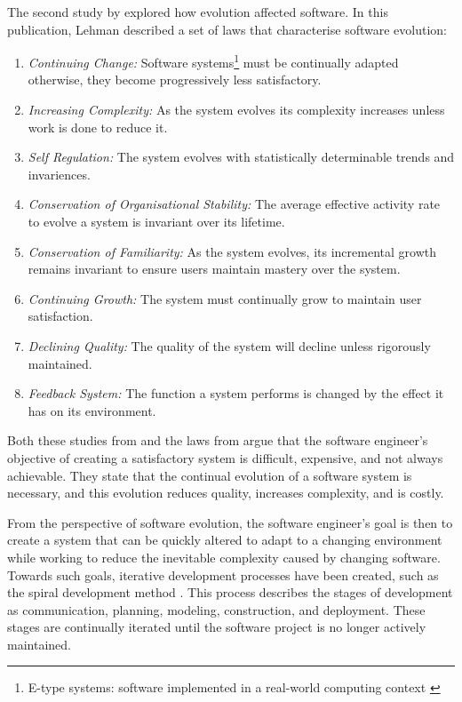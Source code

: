 The second study by \cite{lehman1980} explored how evolution affected software.
In this publication, Lehman described a set of laws that characterise software evolution:
\begin{enumerate}
  \item \textit{Continuing Change:} Software systems\footnote{E-type systems: software implemented in a real-world computing context \citep{lehman1980}} must be continually adapted 
  otherwise, they become progressively less satisfactory.
  \item \textit{Increasing Complexity:} As the system evolves its complexity increases unless work is done to reduce it.
  \item \textit{Self Regulation:} The system evolves with statistically determinable trends and invariences.
  \item \textit{Conservation of Organisational Stability:} The average effective activity rate to evolve a system is invariant over its lifetime.
  \item \textit{Conservation of Familiarity:} As the system evolves, its incremental growth remains invariant to ensure users maintain mastery over the system.
  \item \textit{Continuing Growth:} The system must continually grow to maintain user satisfaction.
  \item \textit{Declining Quality:} The quality of the system will decline unless rigorously maintained.
  \item \textit{Feedback System:} The function a system performs is changed by the effect it has on its environment.
\end{enumerate}

Both these studies from \cite{Lientz1980} and the laws from \citep{lehman1980} argue that
the software engineer's objective of creating a satisfactory system is difficult, expensive, and not always achievable.
They state that the continual evolution of a software system is necessary, and this evolution reduces quality, increases complexity, and is costly.

From the perspective of software evolution, the software engineer's goal is then to create a system that can be quickly altered to adapt to a changing environment 
while working to reduce the inevitable complexity caused by changing software.
Towards such goals, iterative development processes have been created, such as the spiral development method \citep{Boehm1988}.
This process describes the stages of development as communication, planning, modeling, construction, and deployment. 
These stages are continually iterated until the software project is no longer actively maintained. 

